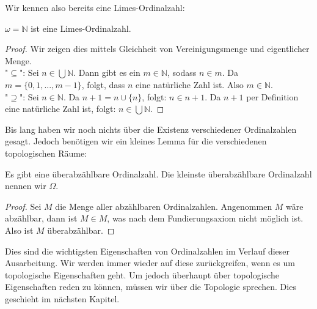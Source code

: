 \documentclass[11pt]{scrartcl}
\newcommand{\N}{\mathbb{N}}
\begin{document}
Wir kennen also bereits eine Limes-Ordinalzahl:
\begin{example}
	$\omega =\N$ ist eine Limes-Ordinalzahl.
\end{example}
\begin{proof}
	Wir zeigen dies mittels Gleichheit von Vereinigungsmenge und eigentlicher Menge. \\
	"$\subseteq$": Sei $n\in \bigcup\N$. Dann gibt es ein $m\in \N$, sodass $n\in m$. Da $m=\{ 0,1,...,m-1 \}$, folgt, dass $n$ eine natürliche Zahl ist. Also $m \in \N$. \\
	"$\supseteq$": Sei $n \in \N$. Da $n+1 = n \cup \{ n \}$, folgt: $n\in n+1$. Da $n+1$ per Definition eine natürliche Zahl ist, folgt: $n\in \bigcup\N$.
\end{proof}
Bis lang haben wir noch nichts über die Existenz verschiedener Ordinalzahlen gesagt. Jedoch benötigen wir ein kleines Lemma für die verschiedenen topologischen Räume:
\begin{lemma}
	Es gibt eine überabzählbare Ordinalzahl. Die kleinste überabzählbare Ordinalzahl nennen wir $\Omega$.
\end{lemma}
\begin{proof}
	Sei $M$ die Menge aller abzählbaren Ordinalzahlen. Angenommen $M$ wäre abzählbar, dann ist $M\in M$, was nach dem Fundierungsaxiom nicht möglich ist. Also ist $M$ überabzählbar.
\end{proof}
Dies sind die wichtigsten Eigenschaften von Ordinalzahlen im Verlauf dieser Ausarbeitung. Wir werden immer wieder auf diese zurückgreifen, wenn es um topologische Eigenschaften geht. Um jedoch überhaupt über topologische Eigenschaften reden zu können, müssen wir über die Topologie sprechen. Dies geschieht im nächsten Kapitel.
\end{document}
